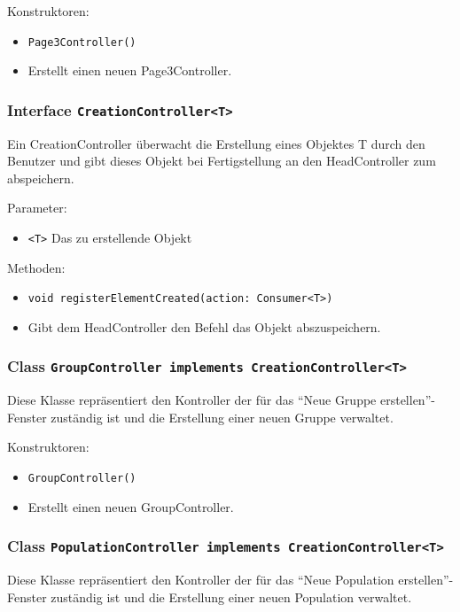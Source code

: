 \documentclass[parskip=full,11pt]{scrartcl}
\begin{document}
Konstruktoren:
\begin{itemize}\itemsep -10pt
\item \texttt{Page3Controller()}
\item[] Erstellt einen neuen Page3Controller.
\end{itemize}

\subsubsection{Interface \texttt{CreationController<T>}}

Ein CreationController überwacht die Erstellung eines Objektes T durch den Benutzer und gibt dieses Objekt bei Fertigstellung an den HeadController zum abspeichern.

Parameter:
\begin{itemize}\itemsep -10pt
	\item \texttt{<T>} Das zu erstellende Objekt
\end{itemize}


Methoden:
\begin{itemize}\itemsep -10pt
	\item \texttt{void registerElementCreated(action: Consumer<T>)}
	\item[] Gibt dem HeadController den Befehl das Objekt abszuspeichern. 	
\end{itemize}

\subsubsection{Class \texttt{GroupController implements CreationController<T>}}
Diese Klasse repräsentiert den Kontroller der für das \enquote{Neue Gruppe erstellen}-Fenster zuständig ist und die Erstellung einer neuen Gruppe verwaltet.

Konstruktoren:
\begin{itemize}\itemsep -10pt
\item \texttt{GroupController()}
\item[] Erstellt einen neuen GroupController.
\end{itemize}

\subsubsection{Class \texttt{PopulationController implements CreationController<T>}}
Diese Klasse repräsentiert den Kontroller der für das \enquote{Neue Population erstellen}-Fenster zuständig ist und die Erstellung einer neuen Population verwaltet.
\end{document}
